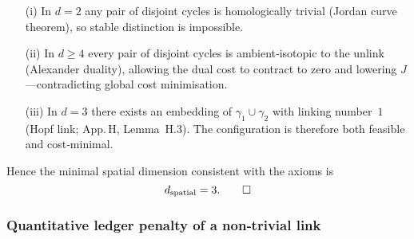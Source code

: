 \begin{enumerate}
\item[(i)]  In $d=2$ any pair of disjoint cycles is homologically trivial
            (Jordan curve theorem), so stable distinction is impossible.
\item[(ii)] In $d\ge4$ every pair of disjoint cycles is ambient‑isotopic to
            the unlink (Alexander duality), allowing the dual cost to
            contract to zero and lowering $J$—contradicting global
            cost minimisation.
\item[(iii)] In $d=3$ there exists an embedding of $\gamma_{1}\!\cup\!\gamma_{2}$
             with linking number $1$ (Hopf link; App.\,H, Lemma H.3).
             The configuration is therefore both feasible and
             cost‑minimal.
\end{enumerate}
Hence the minimal spatial dimension consistent with the axioms is
\[
  d_{\text{spatial}}=3. \qedhere
\]

\subsubsection*{Quantitative ledger penalty of a non‑trivial link}

